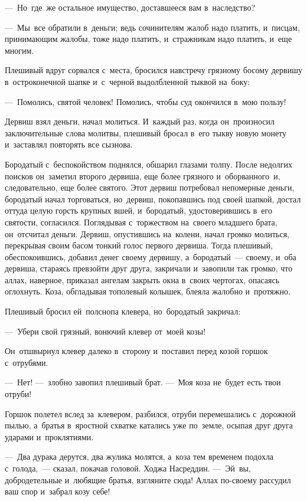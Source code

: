\documentclass[12pt,a4paper]{book}
\begin{document}
—~Но~где~же остальное имущество, доставшееся вам в~наследство?

—~Мы~все обратили в~деньги; ведь сочинителям жалоб надо платить, и~писцам, принимающим жалобы, тоже надо платить, и~стражникам надо платить, и~еще многим.

Плешивый вдруг сорвался с~места, бросился навстречу грязному босому дервишу в~остроконечной шапке и~с~черной выдолбленной тыквой на~боку:

—~Помолись, святой человек! Помолись, чтобы суд окончился в~мою пользу!

Дервиш взял деньги, начал молиться. И~каждый раз, когда он~произносил заключительные слова молитвы, плешивый бросал в~его тыкву новую монету и~заставлял повторять все сызнова.

Бородатый с~беспокойством поднялся, обшарил глазами толпу. После недолгих поисков он~заметил второго дервиша, еще более грязного и~оборванного~и, следовательно, еще более святого. Этот дервиш потребовал непомерные деньги, бородатый начал торговаться, но~дервиш, покопавшись под своей шапкой, достал оттуда целую горсть крупных вшей, и~бородатый, удостоверившись в~его святости, согласился. Поглядывая с~торжеством на~своего младшего брата, он~отсчитал деньги. Дервиш, опустившись на~колени, начал громко молиться, перекрывая своим басом тонкий голос первого дервиша. Тогда плешивый, обеспокоившись, добавил денег своему дервишу, а~бородатый~— своему, и~оба дервиша, стараясь превзойти друг друга, закричали и~завопили так громко, что аллах, наверное, приказал ангелам закрыть окна в~своих чертогах, опасаясь оглохнуть. Коза, обгладывая тополевый колышек, блеяла жалобно и~протяжно.

Плешивый бросил ей~полснопа клевера, но~бородатый закричал:

—~Убери свой грязный, вонючий клевер от~моей козы!

Он~отшвырнул клевер далеко в~сторону и~поставил перед козой горшок с~отрубями.

—~Нет! —~злобно завопил плешивый брат. —~Моя коза не~будет есть твои отруби!

Горшок полетел вслед за~клевером, разбился, отруби перемешались с~дорожной пылью, а~братья в~яростной схватке катались уже по~земле, осыпая друг друга ударами и~проклятиями.

—~Два дурака дерутся, два жулика молятся, а~коза тем временем подохла с~голода,~— сказал, покачав головой. Ходжа Насреддин. —~Эй~вы, добродетельные и~любящие братья, взгляните сюда! Аллах по-своему рассудил ваш спор и~забрал козу себе!
\end{document}
